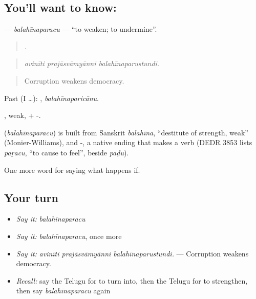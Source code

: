 \subsection*{You'll want to know: }
\textbf{} — \emph{balahīnaparacu} — \textquotedblleft{}to weaken; to undermine\textquotedblright{}.

\begin{quote}
  .
\end{quote}

\begin{quote}
\emph{avinīti prajāsvāmyānni balahīnaparustundi.}
\end{quote}

\begin{quote}
Corruption weakens democracy.
\end{quote}

Past (I …): , \emph{balahīnaparicānu}.

, weak, + -.

\begin{cousinweb}
\textbf{} (\emph{balahīnaparacu}) is built from Sanskrit \emph{balahīna}, \textquotedblleft{}destitute of strength, weak\textquotedblright{} (Monier-Williams), and -, a native ending that makes a verb (DEDR 3853 lists \emph{paṟacu}, \textquotedblleft{}to cause to feel\textquotedblright{}, beside \emph{paḍu}).
\end{cousinweb}

\begin{grammarlens}[title={What you've built}]
One more word for saying what happens if.
\end{grammarlens}

\subsection*{Your turn}
\begin{itemize}
\raggedright
  \item \emph{Say it:} \emph{balahīnaparacu}
  \item \emph{Say it:} \emph{balahīnaparacu}, once more
  \item \emph{Say it:} \emph{avinīti prajāsvāmyānni balahīnaparustundi.} — Corruption weakens democracy.
  \item \emph{Recall:} say the Telugu for to turn into, then the Telugu for to strengthen, then say \emph{balahīnaparacu} again
\end{itemize}


